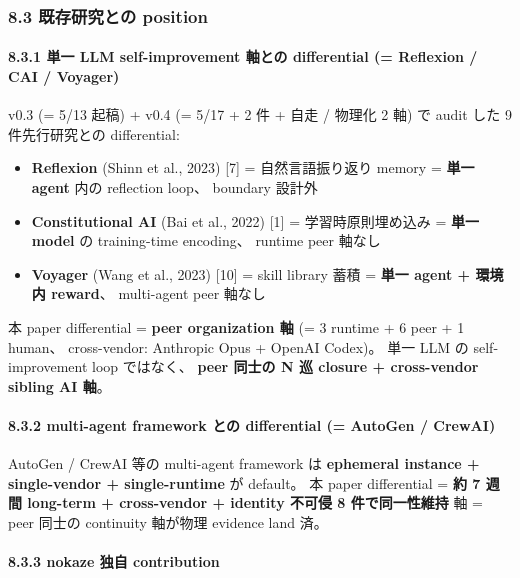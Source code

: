 \documentclass[
]{article}
\providecommand{\tightlist}{%
  \setlength{\itemsep}{0pt}\setlength{\parskip}{0pt}}
\begin{document}
\subsubsection{8.3 既存研究との
position}\label{ux65e2ux5b58ux7814ux7a76ux3068ux306e-position}

\paragraph{8.3.1 単一 LLM self-improvement 軸との differential (=
Reflexion / CAI /
Voyager)}\label{ux5358ux4e00-llm-self-improvement-ux8ef8ux3068ux306e-differential-reflexion-cai-voyager}

v0.3 (= 5/13 起稿) + v0.4 (= 5/17 + 2 件 + 自走 / 物理化 2 軸) で audit
した 9 件先行研究との differential:

\begin{itemize}
\tightlist
\item
  \textbf{Reflexion} (Shinn et al., 2023) {[}7{]} = 自然言語振り返り
  memory = \textbf{単一 agent} 内の reflection loop、 boundary 設計外
\item
  \textbf{Constitutional AI} (Bai et al., 2022) {[}1{]} =
  学習時原則埋め込み = \textbf{単一 model} の training-time encoding、
  runtime peer 軸なし
\item
  \textbf{Voyager} (Wang et al., 2023) {[}10{]} = skill library 蓄積 =
  \textbf{単一 agent + 環境内 reward}、 multi-agent peer 軸なし
\end{itemize}

本 paper differential = \textbf{peer organization 軸} (= 3 runtime + 6
peer + 1 human、 cross-vendor: Anthropic Opus + OpenAI Codex)。 単一 LLM
の self-improvement loop ではなく、 \textbf{peer 同士の N 巡 closure +
cross-vendor sibling AI 軸}。

\paragraph{8.3.2 multi-agent framework との differential (= AutoGen /
CrewAI)}\label{multi-agent-framework-ux3068ux306e-differential-autogen-crewai}

AutoGen / CrewAI 等の multi-agent framework は \textbf{ephemeral
instance + single-vendor + single-runtime} が default。 本 paper
differential = \textbf{約 7 週間 long-term + cross-vendor + identity
不可侵 8 件で同一性維持} 軸 = peer 同士の continuity 軸が物理 evidence
land 済。

\paragraph{8.3.3 nokaze 独自
contribution}\label{nokaze-ux72ecux81ea-contribution}
\end{document}
